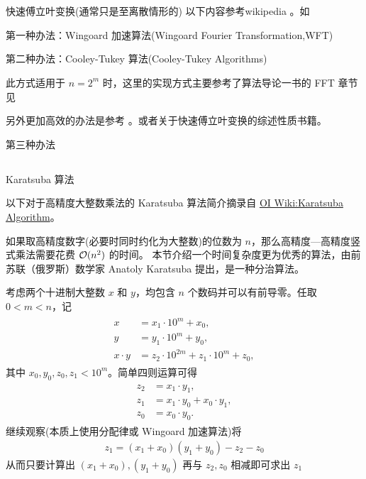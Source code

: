 \section{}

\subsection{}

快速傅立叶变换(通常只是至离散情形的)
以下内容参考wikipedia 。如



第一种办法：Wingoard 加速算法(Wingoard Fourier Transformation,WFT)

第二种办法：Cooley-Tukey 算法(Cooley-Tukey Algorithms)

此方式适用于 $n= 2^m$ 时，这里的实现方式主要参考了算法导论一书的 FFT 章节见 \cite[Polynomials and FFT]{Cormen2022}

另外更加高效的办法是参考 \cite{Li2010}。或者关于快速傅立叶变换的综述性质书籍\cite{Nussbaumer1982}。

第三种办法

\subsection{}

Karatsuba 算法

以下对于高精度大整数乘法的 Karatsuba 算法简介摘录自 \href{https://oi-wiki.org/math/bignum/#karatsuba-%E4%B9%98%E6%B3%95}{OI Wiki:Karatsuba Algorithm}。

如果取高精度数字(必要时同时约化为大整数)的位数为 $n$，那么高精度—高精度竖式乘法需要花费 $\mathcal{O}(n^2)$ 的时间。
本节介绍一个时间复杂度更为优秀的算法，由前苏联（俄罗斯）数学家 Anatoly Karatsuba 提出，是一种分治算法。

考虑两个十进制大整数 $x$ 和 $y$，均包含 $n$ 个数码并可以有前导零。任取 $0 < m < n$，记
\begin{eqnarray*}
    \begin{aligned}
        x &= x_1 \cdot 10^m + x_0, \\
        y &= y_1 \cdot 10^m + y_0, \\
        x \cdot y &= z_2 \cdot 10^{2m} + z_1 \cdot 10^m + z_0,
    \end{aligned}
\end{eqnarray*}
其中 $x_0,y_0,z_0,z_1 < 10^m$。简单四则运算可得
\begin{eqnarray*}
    \begin{aligned}
        z_2 &= x_1 \cdot y_1, \\
        z_1 &= x_1 \cdot y_0 + x_0 \cdot y_1, \\
        z_0 &= x_0 \cdot y_0.
    \end{aligned}    
\end{eqnarray*}
继续观察(本质上使用分配律或 Wingoard 加速算法)将
\begin{eqnarray*}
    z_1 = (x_1 + x_0)(y_1 + y_0) - z_2 - z_0
\end{eqnarray*}
从而只要计算出 $(x_1+x_0), (y_1 + y_0)$ 再与 $z_2,z_0$ 相减即可求出 $z_1$

